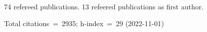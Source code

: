 74 refereed publications. 13 refeered publications as first author.

Total citations~=~2935; h-index~=~29 (2022-11-01)